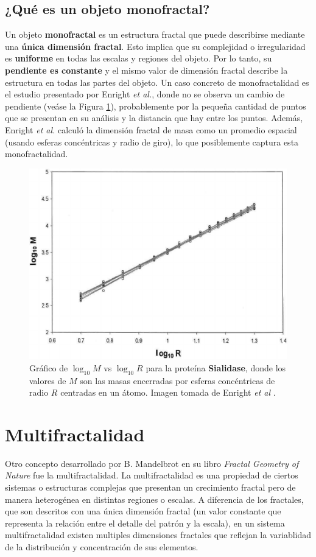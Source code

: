\subsection*{¿Qu\'{e} es un objeto monofractal?}

Un objeto \textbf{monofractal} es un estructura fractal que puede describirse mediante una \textbf{\'{u}nica dimensi\'{o}n fractal}. Esto implica que su complejidad o irregularidad es \textbf{uniforme} en todas las escalas y regiones del objeto. Por lo tanto, su \textbf{pendiente es constante} y el mismo valor de dimensi\'{o}n fractal describe la estructura en todas las partes del objeto. Un caso concreto de monofractalidad es el estudio presentado por Enright \textit{et al.}\cite{Enright2005}, donde no se observa un cambio de pendiente (ve\'{a}se la Figura \ref{fig:Enright-Fractal}), probablemente por la pequeña cantidad de puntos que se presentan en su an\'{a}lisis y la distancia que hay entre los puntos. Adem\'{a}s, Enright \textit{et al.} calcul\'{o} la dimensi\'{o}n fractal de masa como un promedio espacial (usando esferas conc\'{e}ntricas y radio de giro), lo que posiblemente captura esta monofractalidad.

\begin{figure}[H]
	\begin{center}
		\includegraphics[width=0.4\linewidth]{graphs/Enright2005}
		\caption{Gr\'{a}fico de $\log_{10}M$ vs $\log_{10}R$ para la prote\'{i}na \textbf{Sialidase}, donde los valores de $M$ son las masas encerradas por esferas conc\'{e}ntricas de radio $R$ centradas en un \'{a}tomo. Imagen tomada de Enright \textit{et al} \cite{Enright2005}.}
		\label{fig:Enright-Fractal}
	\end{center}
\end{figure}

\section{Multifractalidad}

Otro concepto desarrollado por B. Mandelbrot en su libro \textit{Fractal Geometry of Nature} fue la multifractalidad. La multifractalidad es una propiedad de ciertos sistemas o estructuras complejas que presentan un crecimiento fractal pero de manera heterog\'{e}nea en distintas regiones o escalas. A diferencia de los fractales, que son descritos con una \'{u}nica dimensi\'{o}n fractal (un valor constante que representa la relaci\'{o}n entre el detalle del patr\'{o}n y la escala), en un sistema multifractalidad existen multiples dimensiones fractales que reflejan la variablidad de la distribuci\'{o}n y concentraci\'{o}n de sus elementos. 

